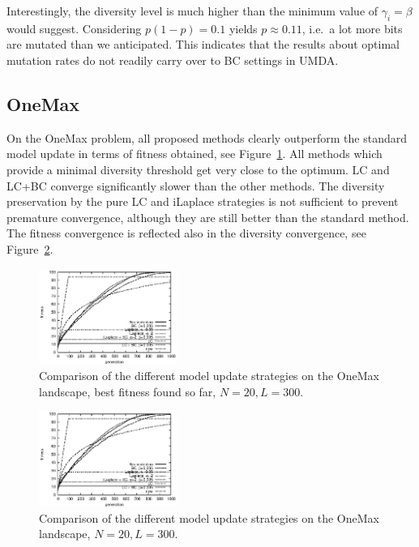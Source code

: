 \documentclass{acm_proc_article-sp}
\newcommand{\Np}{N}
\newcommand{\p}{\gamma}
\begin{document}
Interestingly, the diversity level is much higher than the minimum value of $\p_i=\beta$ would suggest. Considering $p(1-p)=0.1$ yields $p\approx 0.11$, i.e.\ a lot more bits are
mutated than we anticipated. This indicates that the results about optimal mutation rates do not readily carry over to BC settings in UMDA.

\subsection{OneMax}
\label{sec:onemax}

On the OneMax problem, all proposed methods clearly outperform the standard model update
in terms of fitness obtained, see Figure~\ref{fig:oneFitness}. All methods which provide a minimal diversity threshold
get very close to the optimum. LC and LC+BC converge significantly slower than the other
methods. The diversity preservation by the pure LC and iLaplace strategies 
is not sufficient to prevent premature convergence, although they are still better than the standard method.
The fitness convergence is reflected also in the diversity convergence, see Figure~\ref{fig:oneDiversity}.

\begin{figure}[HT]
\centerline{
\includegraphics[width=0.4\textwidth]{graph_leading1169910391/graph_leading000_fitness.eps}}
\caption{Comparison of the different model update strategies on the OneMax landscape, best fitness found so far, $\Np=20, L=300$.\label{fig:oneFitness}}
\end{figure}
\begin{figure}[HT]
\centerline{
\includegraphics[width=0.4\textwidth]{graph_leading1169910391/graph_leading000_fitness.eps}}
\caption{Comparison of the different model update strategies on the OneMax landscape, $\Np=20, L=300$.\label{fig:oneDiversity}}
\end{figure}
\end{document}
